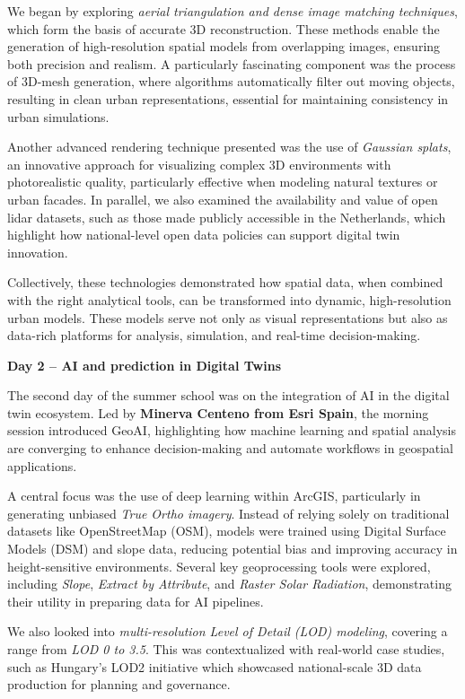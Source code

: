 \documentclass[
  letterpaper,
  DIV=11,
  numbers=noendperiod]{scrartcl}
\begin{document}
We began by exploring \emph{aerial triangulation and dense image
matching techniques}, which form the basis of accurate 3D
reconstruction. These methods enable the generation of high-resolution
spatial models from overlapping images, ensuring both precision and
realism. A particularly fascinating component was the process of 3D-mesh
generation, where algorithms automatically filter out moving objects,
resulting in clean urban representations, essential for maintaining
consistency in urban simulations.

Another advanced rendering technique presented was the use of
\emph{Gaussian splats}, an innovative approach for visualizing complex
3D environments with photorealistic quality, particularly effective when
modeling natural textures or urban facades. In parallel, we also
examined the availability and value of open lidar datasets, such as
those made publicly accessible in the Netherlands, which highlight how
national-level open data policies can support digital twin innovation.

Collectively, these technologies demonstrated how spatial data, when
combined with the right analytical tools, can be transformed into
dynamic, high-resolution urban models. These models serve not only as
visual representations but also as data-rich platforms for analysis,
simulation, and real-time decision-making.

\textbf{Day 2 -- AI and prediction in Digital Twins}

The second day of the summer school was on the integration of AI in the
digital twin ecosystem. Led by \textbf{Minerva Centeno from Esri Spain},
the morning session introduced GeoAI, highlighting how machine learning
and spatial analysis are converging to enhance decision-making and
automate workflows in geospatial applications.

A central focus was the use of deep learning within ArcGIS, particularly
in generating unbiased \emph{True Ortho imagery}. Instead of relying
solely on traditional datasets like OpenStreetMap (OSM), models were
trained using Digital Surface Models (DSM) and slope data, reducing
potential bias and improving accuracy in height-sensitive environments.
Several key geoprocessing tools were explored, including \emph{Slope},
\emph{Extract by Attribute}, and \emph{Raster Solar Radiation},
demonstrating their utility in preparing data for AI pipelines.

We also looked into \emph{multi-resolution Level of Detail (LOD)
modeling}, covering a range from \emph{LOD 0 to 3.5}. This was
contextualized with real-world case studies, such as Hungary's LOD2
initiative which showcased national-scale 3D data production for
planning and governance.
\end{document}
